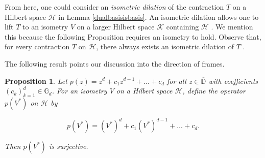\documentclass[10pt, reqno]{amsart}
\newtheorem{proposition}[theorem]{Proposition}
\theoremstyle{definition}
\numberwithin{equation}{section}
\begin{document}
\noindent From here, one could consider an {\it{isometric dilation}} of the contraction $T$ on a Hilbert space $\mathcal{H}$ in Lemma \ref{dualbasisisbasis}. An isometric dilation allows one to lift $T$ to an isometry $V$ on a larger Hilbert space $\mathcal{K}$ containing $\mathcal{H}$ \cite[Section 4]{NagyFoais}. We mention this because the following Proposition requires an isometry to hold. Observe that, for every contraction $T$ on $\mathcal{H}$, there always exists an isometric dilation of $T$ \cite[Theorem 4.1]{NagyFoais}.

The following result points our discussion into the direction of frames.

\begin{proposition}\label{Psurjective}
Let $p(z)=z^{d}+c_{1}z^{d-1}+\hdots+c_{d}$ for all $z\in\overline{\mathbb{D}}$ with coefficients $(c_{k})_{k=1}^{d}\in\mathbb{G}_{d}$. For an isometry $V$ on a Hilbert space $\mathcal{H}$, define the operator $p(V^{*})$ on $\mathcal{H}$ by

$$p(V^{*})=(V^{*})^{d}+c_{1}(V^{*})^{d-1}+\hdots +c_{d}.$$

\noindent Then $p(V^{*})$ is surjective.

\end{proposition}
\end{document}
